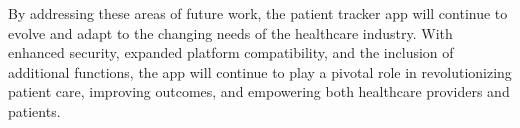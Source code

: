 \documentclass[12pt]{article}
\begin{document}
			By addressing these areas of future work, the patient tracker app will continue to evolve
			and adapt to the changing needs of the healthcare industry. With enhanced security,
			expanded platform compatibility, and the inclusion of additional functions, the app will
			continue to play a pivotal role in revolutionizing patient care, improving outcomes, and
			empowering both healthcare providers and patients.
	
	
\end{document}
